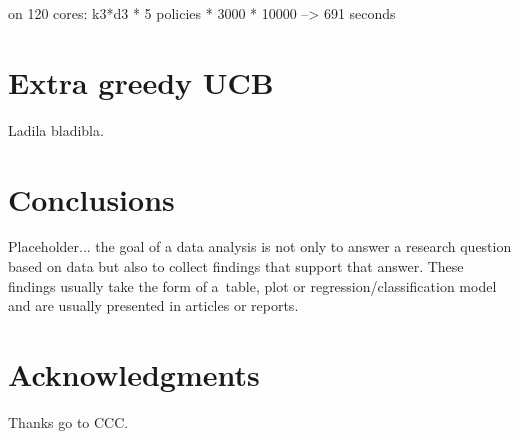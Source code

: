 \documentclass[nojss]{jss}\usepackage[]{graphicx}\usepackage[]{color}
\begin{document}
on 120 cores:    k3*d3 * 5 policies * 3000 * 10000 --\textgreater{} 691 seconds



\section{Extra greedy UCB}

Ladila bladibla.

\section{Conclusions}
\label{sec:conc4}

Placeholder... the goal of a data analysis is not only to answer a research question based on data but also to collect findings that support that answer. These findings usually take the form of a~table, plot or regression/classification model and are usually presented in articles or reports.

\section{Acknowledgments}

Thanks go to CCC.

%

\end{document}
